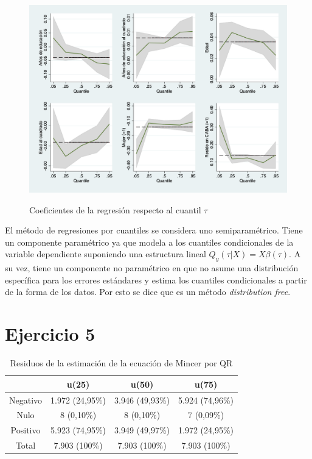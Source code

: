 \documentclass[11pt]{article}
\begin{document}
\begin{figure}[H]
	\caption{Coeficientes de la regresión respecto al cuantil $\tau$}
	\centering
	\includegraphics[width=0.8\linewidth]{4.png}
	\label{fig: 4}
\end{figure}

El método de regresiones por cuantiles se considera uno semiparamétrico. Tiene un componente paramétrico ya que modela a los cuantiles condicionales de la variable dependiente suponiendo una estructura lineal $Q_y(\tau | X ) = X \beta(\tau)$. A su vez, tiene un componente no paramétrico en que no asume una distribución específica para los errores estándares y estima los cuantiles condicionales a partir de la forma de los datos. Por esto se dice que es un método \textit{distribution free}.

\section*{Ejercicio 5}

\begin{table}[H]
    \centering
     \caption{Residuos de la estimación de la ecuación de Mincer por QR}
    \begin{tabular}{|c|c|c|c|}
    \hline
         & \textbf{u(25)} & \textbf{u(50)} & \textbf{u(75)}\\ \hline
    Negativo & 1.972 (24,95\%) & 3.946 (49,93\%) & 5.924 (74,96\%) \\
    Nulo     & 8 (0,10\%) & 8 (0,10\%) & 7 (0,09\%) \\
    Positivo & 5.923 (74,95\%) & 3.949 (49,97\%) & 1.972 (24,95\%) \\ \hline
    Total    & 7.903 (100\%) & 7.903 (100\%) & 7.903 (100\%) \\ \hline
    \end{tabular}
    \label{tab:residuos_QR}
\end{table}
\end{document}
